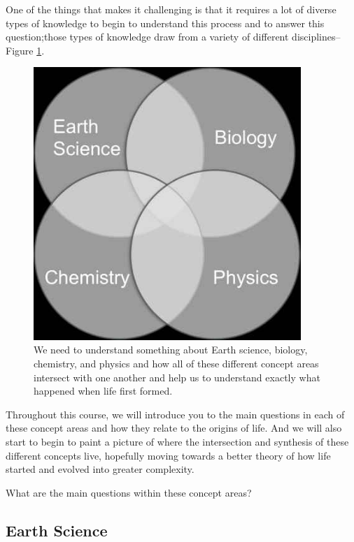 \documentclass[]{article}
\begin{document}
One of the things that makes it challenging is that it requires a lot of diverse types of knowledge to begin to understand this process and to answer this question;those types of knowledge draw from a variety of different disciplines--Figure \ref{fig:tradional:disciplines}.
\begin{figure}[H]
	\begin{center}
		\caption[Traditional disciplines needed for Origin of Life]{We need to understand something about Earth science, biology, chemistry, and physics and how all of these different concept areas intersect with one another and help us to understand exactly what happened when life first formed.}\label{fig:tradional:disciplines}
		\includegraphics[width=0.9\textwidth]{4mainAreas}
	\end{center}
\end{figure}

Throughout this course, we will introduce you to the main questions in each of these concept areas and how they relate to the origins of life. And we will also start to begin to paint a picture of where the intersection and synthesis of these different concepts live, hopefully moving towards a better theory of how life started and evolved into greater complexity.

What are the main questions within these concept areas? 

\subsection{Earth Science}
\end{document}
